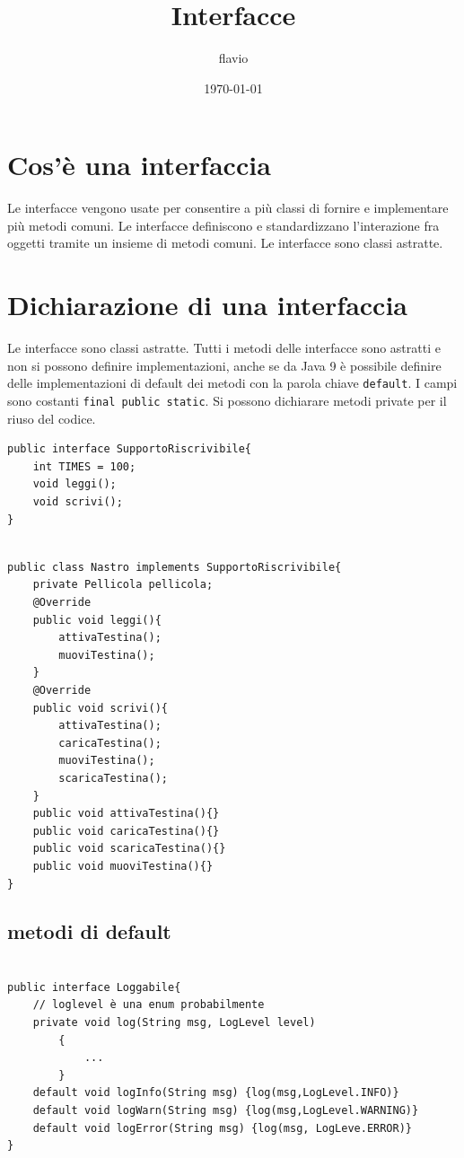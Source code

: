 \documentclass[11pt]{article}
\author{flavio}
\date{\today}
\title{Interfacce}
\begin{document}
\maketitle
\tableofcontents

\section{Cos'è una interfaccia}
\label{sec:orgbd290fd}
Le interfacce vengono usate per consentire a più classi di fornire e implementare più metodi comuni. Le interfacce definiscono e standardizzano l'interazione fra oggetti tramite un insieme di metodi comuni. Le interfacce sono classi astratte.
\section{Dichiarazione di una interfaccia}
\label{sec:orgbde68e4}
Le interfacce sono classi astratte. Tutti i metodi delle interfacce sono astratti e non si possono definire implementazioni, anche se da Java 9 è possibile definire delle implementazioni di default dei metodi con la parola chiave \texttt{default}. I campi sono costanti \texttt{final public static}. Si possono dichiarare metodi private per il riuso del codice.

\begin{verbatim}
public interface SupportoRiscrivibile{
    int TIMES = 100;
    void leggi();
    void scrivi();
}
\end{verbatim}

\begin{verbatim}

public class Nastro implements SupportoRiscrivibile{
    private Pellicola pellicola;
    @Override
    public void leggi(){
        attivaTestina();
        muoviTestina();
    }
    @Override
    public void scrivi(){
        attivaTestina();
        caricaTestina();
        muoviTestina();
        scaricaTestina();
    }
    public void attivaTestina(){}
    public void caricaTestina(){}
    public void scaricaTestina(){}
    public void muoviTestina(){}
}

\end{verbatim}
\subsection{metodi di default}
\label{sec:orge212901}

\begin{verbatim}

public interface Loggabile{
    // loglevel è una enum probabilmente
    private void log(String msg, LogLevel level)
        {
            ...
        }
    default void logInfo(String msg) {log(msg,LogLevel.INFO)}
    default void logWarn(String msg) {log(msg,LogLevel.WARNING)}
    default void logError(String msg) {log(msg, LogLeve.ERROR)}
}

\end{verbatim}
\end{document}
